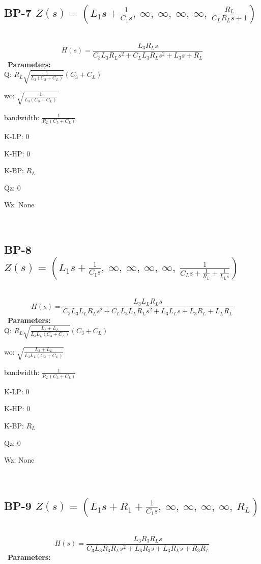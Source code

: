 \documentclass{article}
\begin{document}
\ 

\subsection{BP-7 $Z(s) = \left( L_{1} s + \frac{1}{C_{1} s}, \  \infty, \  \infty, \  \infty, \  \infty, \  \frac{R_{L}}{C_{L} R_{L} s + 1}\right)$ } \ 
\textbf{\[H(s) = \frac{L_{3} R_{L} s}{C_{3} L_{3} R_{L} s^{2} + C_{L} L_{3} R_{L} s^{2} + L_{3} s + R_{L}}\] } \ 
\textbf{Parameters:}\\ 

Q: $R_{L} \sqrt{\frac{1}{L_{3} \left(C_{3} + C_{L}\right)}} \left(C_{3} + C_{L}\right)$\ 

wo: $\sqrt{\frac{1}{L_{3} \left(C_{3} + C_{L}\right)}}$\ 

bandwidth: $\frac{1}{R_{L} \left(C_{3} + C_{L}\right)}$\ 

K-LP: $0$\ 

K-HP: $0$\ 

K-BP: $R_{L}$\ 

Qz: $0$\ 

Wz: $\text{None}$\ 

\ 

\subsection{BP-8 $Z(s) = \left( L_{1} s + \frac{1}{C_{1} s}, \  \infty, \  \infty, \  \infty, \  \infty, \  \frac{1}{C_{L} s + \frac{1}{R_{L}} + \frac{1}{L_{L} s}}\right)$ } \ 
\textbf{\[H(s) = \frac{L_{3} L_{L} R_{L} s}{C_{3} L_{3} L_{L} R_{L} s^{2} + C_{L} L_{3} L_{L} R_{L} s^{2} + L_{3} L_{L} s + L_{3} R_{L} + L_{L} R_{L}}\] } \ 
\textbf{Parameters:}\\ 

Q: $R_{L} \sqrt{\frac{L_{3} + L_{L}}{L_{3} L_{L} \left(C_{3} + C_{L}\right)}} \left(C_{3} + C_{L}\right)$\ 

wo: $\sqrt{\frac{L_{3} + L_{L}}{L_{3} L_{L} \left(C_{3} + C_{L}\right)}}$\ 

bandwidth: $\frac{1}{R_{L} \left(C_{3} + C_{L}\right)}$\ 

K-LP: $0$\ 

K-HP: $0$\ 

K-BP: $R_{L}$\ 

Qz: $0$\ 

Wz: $\text{None}$\ 

\ 

\subsection{BP-9 $Z(s) = \left( L_{1} s + R_{1} + \frac{1}{C_{1} s}, \  \infty, \  \infty, \  \infty, \  \infty, \  R_{L}\right)$ } \ 
\textbf{\[H(s) = \frac{L_{3} R_{3} R_{L} s}{C_{3} L_{3} R_{3} R_{L} s^{2} + L_{3} R_{3} s + L_{3} R_{L} s + R_{3} R_{L}}\] } \ 
\textbf{Parameters:}\\ 
\end{document}
